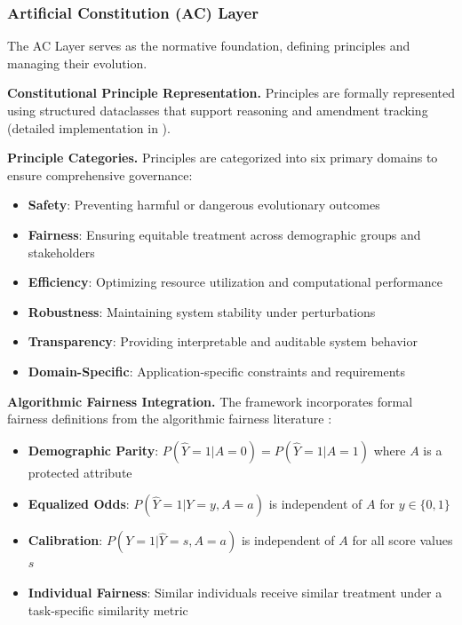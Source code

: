\documentclass[sigconf,natbib]{acmart}
\begin{document}
\subsubsection{Artificial Constitution (AC) Layer}
The AC Layer serves as the normative foundation, defining principles and managing their evolution.

\textbf{Constitutional Principle Representation.} Principles are formally represented using structured dataclasses that support reasoning and amendment tracking (detailed implementation in ).

\textbf{Principle Categories.} Principles are categorized into six primary domains to ensure comprehensive governance:

\begin{itemize}
    \item \textbf{Safety}: Preventing harmful or dangerous evolutionary outcomes
    \item \textbf{Fairness}: Ensuring equitable treatment across demographic groups and stakeholders
    \item \textbf{Efficiency}: Optimizing resource utilization and computational performance
    \item \textbf{Robustness}: Maintaining system stability under perturbations
    \item \textbf{Transparency}: Providing interpretable and auditable system behavior
    \item \textbf{Domain-Specific}: Application-specific constraints and requirements
\end{itemize}

\textbf{Algorithmic Fairness Integration.} The framework incorporates formal fairness definitions from the algorithmic fairness literature \cite{Barocas2023FairnessML, Hardt2016EqualityOpportunity, Chouldechova2017FairPrediction}:

\begin{itemize}
    \item \textbf{Demographic Parity}: $P(\hat{Y} = 1 | A = 0) = P(\hat{Y} = 1 | A = 1)$ where $A$ is a protected attribute
    \item \textbf{Equalized Odds}: $P(\hat{Y} = 1 | Y = y, A = a)$ is independent of $A$ for $y \in \{0,1\}$
    \item \textbf{Calibration}: $P(Y = 1 | \hat{Y} = s, A = a)$ is independent of $A$ for all score values $s$
    \item \textbf{Individual Fairness}: Similar individuals receive similar treatment under a task-specific similarity metric
\end{itemize}
\end{document}
